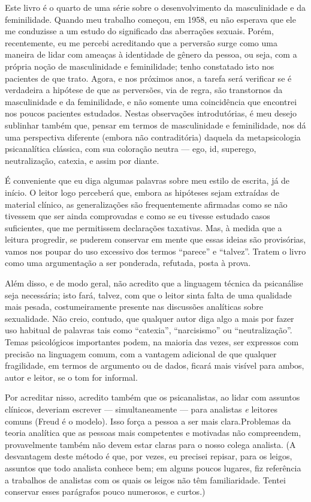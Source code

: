 Este livro é o quarto de uma série sobre o desenvolvimento da
masculinidade e da feminilidade. Quando meu trabalho começou, em 1958,
eu não esperava que ele me conduzisse a um estudo do significado das
aberrações sexuais. Porém, recentemente, eu me percebi acreditando que
a perversão surge como uma maneira de lidar com ameaças à identidade de
gênero\idxiden{} da pessoa, ou seja, com a própria noção de masculinidade e
feminilidade; tenho constatado isto nos pacientes de que trato. Agora,
e nos próximos anos, a tarefa será verificar se é verdadeira a
hipótese de que as perversões, via de regra, são transtornos da
masculinidade e da feminilidade, e não somente uma coincidência que
encontrei nos poucos pacientes estudados. Nestas observações
introdutórias, é meu desejo sublinhar também que, pensar em termos de
masculinidade e feminilidade, nos dá uma perspectiva diferente (embora
não contraditória) daquela da metapsicologia psicanalítica\idxpsica{} clássica,
com sua coloração neutra --- ego, id, superego, neutralização, catexia, e
assim por diante.

É conveniente que eu diga algumas palavras sobre meu estilo de
escrita, já de início. O leitor logo perceberá que, embora as hipóteses
sejam extraídas de material clínico, as generalizações são
frequentemente afirmadas como se não tivessem que ser ainda comprovadas
e como se eu tivesse estudado casos suficientes, que me permitissem
declarações taxativas. Mas, à medida que a leitura progredir, se
puderem conservar em mente que essas ideias são provisórias, vamos
nos poupar do uso excessivo dos termos ``parece'' e
``talvez''. Tratem o livro como uma argumentação a ser ponderada, refutada, posta à prova.

Além disso, e de modo geral, não acredito que a linguagem técnica da
psicanálise seja necessária; isto fará, talvez, com que o leitor sinta
falta de uma qualidade mais pesada, costumeiramente presente nas
discussões analíticas sobre sexualidade. Não creio, contudo, que
qualquer autor diga algo a mais por fazer uso habitual de palavras tais
como ``catexia'', ``narcisismo'' ou ``neutralização''. Temas psicológicos
importantes podem, na maioria das vezes, ser expressos com precisão na
linguagem comum, com a vantagem adicional de que qualquer fragilidade,
em termos de argumento ou de dados, ficará mais visível para ambos,
autor e leitor, se o tom for informal.

Por acreditar nisso, acredito também que os psicanalistas, ao lidar
com assuntos clínicos, deveriam escrever --- simultaneamente --- para
analistas \textit{e} leitores comuns (Freud\idxfreud{} é o modelo). Isso força a
pessoa a ser mais clara.\idxsexop[|(] Problemas da teoria analítica que as pessoas
mais competentes e motivadas não compreendem, provavelmente também não
devem estar claras para o nosso colega analista. (A desvantagem deste
método é que, por vezes, eu precisei repisar, para os leigos, assuntos
que todo analista conhece bem; em alguns poucos lugares, fiz
referência a trabalhos de analistas com os quais os leigos não têm
familiaridade. Tentei conservar esses parágrafos pouco numerosos, e
curtos.)

